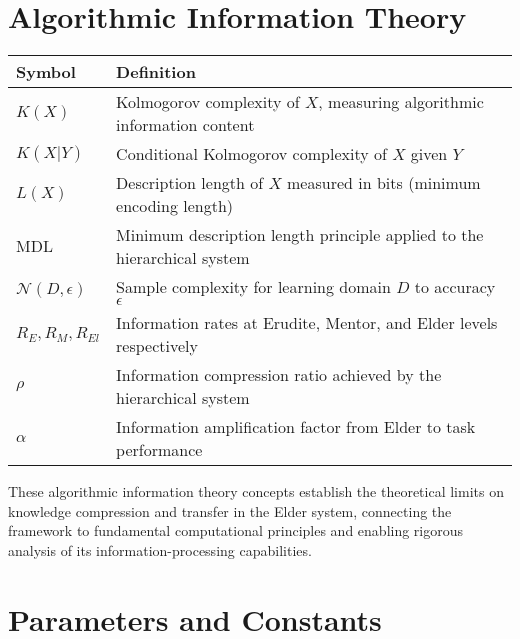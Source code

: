 \clearpage
\chapter*{Algorithmic Information Theory}

\begin{center}
\begin{tabular}{>{\centering\arraybackslash}p{3cm} p{10cm}}
\hline
\textbf{Symbol} & \textbf{Definition} \\
\hline
$K(X)$ & Kolmogorov complexity of $X$, measuring algorithmic information content \\
$K(X|Y)$ & Conditional Kolmogorov complexity of $X$ given $Y$ \\
$L(X)$ & Description length of $X$ measured in bits (minimum encoding length) \\
$\text{MDL}$ & Minimum description length principle applied to the hierarchical system \\
$\mathcal{N}(D, \epsilon)$ & Sample complexity for learning domain $D$ to accuracy $\epsilon$ \\
$R_E, R_M, R_{El}$ & Information rates at Erudite, Mentor, and Elder levels respectively \\
$\rho$ & Information compression ratio achieved by the hierarchical system \\
$\alpha$ & Information amplification factor from Elder to task performance \\
\hline
\end{tabular}
\end{center}

\vspace{1cm}
\begin{center}
These algorithmic information theory concepts establish the theoretical limits on knowledge compression and transfer in the Elder system, connecting the framework to fundamental computational principles and enabling rigorous analysis of its information-processing capabilities.
\end{center}

\clearpage
\chapter*{Parameters and Constants}

